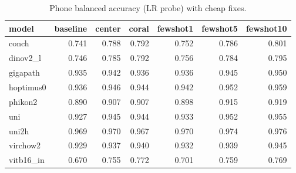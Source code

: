 \begin{table}[t]
\centering
\small
\begin{tabular}{lrrrrrr}
\toprule
model & baseline & center & coral & fewshot1 & fewshot5 & fewshot10 \\
\midrule
conch & 0.741 & 0.788 & 0.792 & 0.752 & 0.786 & 0.801 \\
dinov2\_l & 0.746 & 0.785 & 0.792 & 0.756 & 0.784 & 0.795 \\
gigapath & 0.935 & 0.942 & 0.936 & 0.936 & 0.945 & 0.950 \\
hoptimus0 & 0.936 & 0.946 & 0.944 & 0.942 & 0.952 & 0.959 \\
phikon2 & 0.890 & 0.907 & 0.907 & 0.898 & 0.915 & 0.919 \\
uni & 0.927 & 0.945 & 0.944 & 0.933 & 0.952 & 0.955 \\
uni2h & 0.969 & 0.970 & 0.967 & 0.970 & 0.974 & 0.976 \\
virchow2 & 0.929 & 0.937 & 0.940 & 0.932 & 0.939 & 0.945 \\
vitb16\_in & 0.670 & 0.755 & 0.772 & 0.701 & 0.759 & 0.769 \\
\bottomrule
\end{tabular}
\caption{Phone balanced accuracy (LR probe) with cheap fixes.}
\label{tab:fixes}
\end{table}
